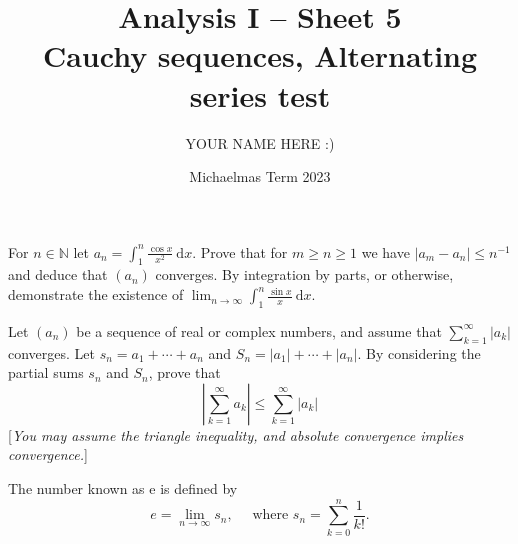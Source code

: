 \documentclass[answers]{exam}
\title{Analysis I -- Sheet 5\\Cauchy sequences, Alternating series test}
\author{YOUR NAME HERE :)}
\date{Michaelmas Term 2023}
\begin{document}
\maketitle
\begin{questions}

\question%
For $n \in \mathbb{N}$ let $a_{n}=\int_{1}^{n} \frac{\cos x}{x^{2}} \mathrm{~d} x$. Prove that for $m \geqslant n \geqslant 1$ we have $\left|a_{m}-a_{n}\right| \leqslant n^{-1}$ and deduce that $\left(a_{n}\right)$ converges. By integration by parts, or otherwise, demonstrate the existence of $\lim _{n \to \infty} \int_{1}^{n} \frac{\sin x}{x} \mathrm{~d} x$.



\question%



\question%
Let $\left(a_{n}\right)$ be a sequence of real or complex numbers, and assume that $\sum_{k=1}^{\infty}\left|a_{k}\right|$ converges. Let $s_{n}=a_{1}+\cdots+a_{n}$ and $S_{n}=\left|a_{1}\right|+\cdots+\left|a_{n}\right|$. By considering the partial sums $s_{n}$ and $S_{n}$, prove that \[
\left|\sum_{k=1}^{\infty} a_{k}\right| \leqslant \sum_{k=1}^{\infty}\left|a_{k}\right|
\] [\emph{You may assume the triangle inequality, and absolute convergence implies convergence.}]



\question%
The number known as e is defined by \[
e=\lim _{n \to \infty} s_{n}, \quad \text { where } s_{n}=\sum_{k=0}^{n} \frac{1}{k !}. \]
\begin{parts}

\end{parts}
\end{questions}
\end{document}
